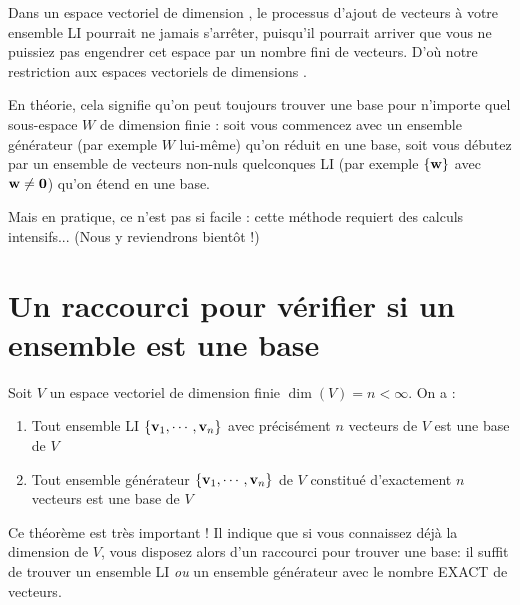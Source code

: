 \begin{remark}
Dans un espace vectoriel de dimension , le processus d'ajout de vecteurs à votre ensemble LI pourrait ne jamais s'arrêter, puisqu'il pourrait arriver que vous
ne puissiez pas engendrer cet espace par un nombre fini de vecteurs.  D'où notre
restriction aux espaces vectoriels de dimensions .  \end{remark}

En théorie, cela signifie qu'on peut toujours trouver une base pour
n'importe quel sous-espace $W$ de dimension finie : soit vous commencez avec un ensemble g\'en\'erateur (par exemple $W$ lui-même) qu'on réduit en une base, soit
vous d\'ebutez par un ensemble de vecteurs non-nuls quelconques LI (par exemple $\{\mathbf{w}\}$ avec $\mathbf{w}\neq\mathbf{0}$) qu'on \'etend en une base.  

Mais en pratique, ce n'est pas si facile : cette méthode requiert des calculs intensifs...  (Nous y reviendrons
bientôt !)



\section{Un raccourci pour vérifier si un ensemble est une base}

\begin{theorem}\label{Raccourci_bases}
Soit $V$ un espace vectoriel de dimension finie $\dim(V) = n < \infty$.
On a :
\begin{enumerate}
\item Tout ensemble LI $\{\mathbf{v}_1, \cdots, \mathbf{v}_n\}$ avec précisément $ n $ vecteurs de $V$ est une base de $V$ 
\item Tout ensemble g\'en\'erateur $\{\mathbf{v}_1, \cdots, \mathbf{v}_n\}$ de $V$ constitué d'exactement $n $ vecteurs est une base de $V$ 
\end{enumerate}
\end{theorem}

Ce théorème est très important ! Il indique que si vous connaissez déjà la dimension de $V$, vous disposez alors d'un raccourci pour trouver une base: il suffit de trouver un ensemble LI \emph{ou} un ensemble gén\'erateur avec le nombre EXACT de vecteurs. 

